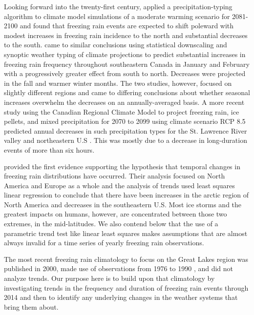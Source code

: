 \documentclass[twocol]{ametsoc}
\begin{document}
 Looking forward into the twenty-first century, \citet{lambert2011simulated} applied a precipitation-typing algorithm to climate model simulations of a moderate warming scenario for 2081-2100 and found that freezing rain events are expected to shift poleward with modest increases in freezing rain incidence to the north and substantial decreases to the south. \citet{cheng2011possible} came to similar conclusions using statistical downscaling and synoptic weather typing of climate projections to predict substantial increases in freezing rain frequency throughout southeastern Canada in January and February with a progressively greater effect from south to north. Decreases were projected in the fall and warmer winter months. The two studies, however, focused on slightly different regions and came to differing conclusions about whether seasonal increases overwhelm the decreases on an annually-averaged basis. A more recent study using the Canadian Regional Climate Model to project freezing rain, ice pellets, and mixed precipitation for 2070 to 2099 using climate scenario RCP 8.5 predicted annual decreases in such precipitation types for the St. Lawrence River valley and northeastern U.S \citep{matte2018mixed}. This was mostly due to a decrease in long-duration events of more than six hours.

\citet{groisman2016recent} provided the first evidence supporting the hypothesis that temporal changes in freezing rain distributions have occurred. Their analysis focused on North America and Europe as a whole and the analysis of trends used least squares linear regression to conclude that there have been increases in the arctic region of North America and decreases in the southeastern U.S.  Most ice storms and the greatest impacts on humans, however, are concentrated between those two extremes, in the mid-latitudes. We also contend below that the use of a parametric trend test like linear least squares makes assumptions that are almost always invalid for a time series of yearly freezing rain observations.

The most recent freezing rain climatology to focus on the Great Lakes region was published in 2000, made use of observations from 1976 to 1990 \citep{cortinas2000climatology}, and did not analyze trends. Our purpose here is to build upon that climatology by investigating trends in the frequency and duration of freezing rain events through 2014 and then to identify any underlying changes in the weather systems that bring them about. 
\end{document}
